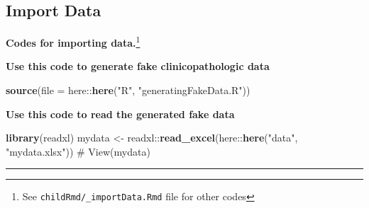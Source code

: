 \documentclass[]{article}
\newenvironment{Shaded}{\begin{snugshade}}{\end{snugshade}}
\newcommand{\CommentTok}[1]{\textcolor[rgb]{0.54,0.53,0.53}{#1}}
\newcommand{\DataTypeTok}[1]{\textcolor[rgb]{0.00,0.34,0.68}{#1}}
\newcommand{\KeywordTok}[1]{\textcolor[rgb]{0.12,0.11,0.11}{\textbf{#1}}}
\newcommand{\NormalTok}[1]{\textcolor[rgb]{0.12,0.11,0.11}{#1}}
\newcommand{\OperatorTok}[1]{\textcolor[rgb]{0.12,0.11,0.11}{#1}}
\newcommand{\StringTok}[1]{\textcolor[rgb]{0.75,0.01,0.01}{#1}}
\let\rmarkdownfootnote\footnote%
\def\footnote{\protect\rmarkdownfootnote}
\begin{document}
\hypertarget{import-data}{%
\subsection{Import Data}\label{import-data}}

\textbf{Codes for importing data.}\footnote{See
  \texttt{childRmd/\_importData.Rmd} file for other codes}

\textbf{Use this code to generate fake clinicopathologic data}

\begin{Shaded}
\begin{Highlighting}[]
\KeywordTok{source}\NormalTok{(}\DataTypeTok{file =}\NormalTok{ here}\OperatorTok{::}\KeywordTok{here}\NormalTok{(}\StringTok{"R"}\NormalTok{, }\StringTok{"generatingFakeData.R"}\NormalTok{))}
\end{Highlighting}
\end{Shaded}

\textbf{Use this code to read the generated fake data}

\begin{Shaded}
\begin{Highlighting}[]
\KeywordTok{library}\NormalTok{(readxl)}
\NormalTok{mydata <-}\StringTok{ }\NormalTok{readxl}\OperatorTok{::}\KeywordTok{read_excel}\NormalTok{(here}\OperatorTok{::}\KeywordTok{here}\NormalTok{(}\StringTok{"data"}\NormalTok{, }\StringTok{"mydata.xlsx"}\NormalTok{))}
\CommentTok{# View(mydata)}
\end{Highlighting}
\end{Shaded}

\begin{center}\rule{0.5\linewidth}{\linethickness}\end{center}
\end{document}
